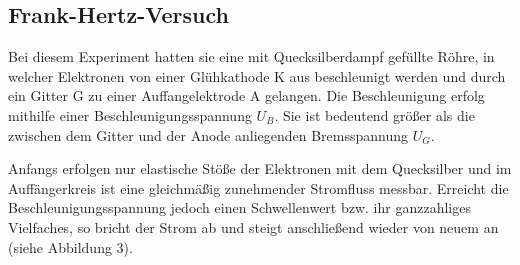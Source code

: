 \documentclass{article}
\begin{document}
\begin{center}
\begin{minipage}{\linewidth}
\centering
{}
%
\label{term}
\end{minipage}
\end{center}

\subsection{Frank-Hertz-Versuch}
\begin{center}
\begin{minipage}{\linewidth}
\centering
{}
%
\label{skizze}
\end{minipage}
\end{center}
Bei diesem Experiment hatten sie eine mit Quecksilberdampf gefüllte Röhre, in welcher Elektronen von einer Glühkathode K aus beschleunigt werden und durch ein Gitter G zu einer Auffangelektrode A gelangen. Die Beschleunigung erfolg mithilfe einer Beschleunigungsspannung \(U_B\). Sie ist bedeutend größer als die zwischen dem Gitter und der Anode anliegenden Bremsspannung \(U_G\).


Anfangs erfolgen nur elastische Stöße der Elektronen mit dem Quecksilber und im Auffängerkreis ist eine gleichmäßig zunehmender Stromfluss messbar. Erreicht die Beschleunigungsspannung jedoch einen Schwellenwert bzw. ihr ganzzahliges Vielfaches, so bricht der Strom ab und steigt anschließend wieder von neuem an (siehe Abbildung 3).
\end{document}
